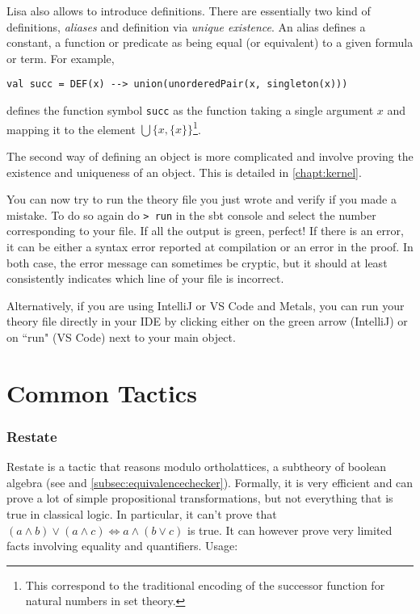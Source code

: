 Lisa also allows to introduce definitions. There are essentially two kind of definitions, \emph{aliases} and definition via \emph{unique existence}.
An alias defines a constant, a function or predicate as being equal (or equivalent) to a given formula or term. For example,

\noindent\begin{minipage}{\linewidth}\vspace{1em}
  \begin{lstlisting}[language=lisa, frame=single]
  val succ = DEF(x) --> union(unorderedPair(x, singleton(x)))
  \end{lstlisting}
\end{minipage}
defines the function symbol \lstinline|succ| as the function taking a single argument $x$ and mapping it to the element $\bigcup \lbrace x, \lbrace x \rbrace \rbrace$\footnote{This correspond to the traditional encoding of the successor function for natural numbers in set theory.}.

The second way of defining an object is more complicated and involve proving the existence and uniqueness of an object. This is detailed in \autoref{chapt:kernel}.

You can now try to run the theory file you just wrote and verify if you made a mistake. To do so again do \lstinline|> run| in the sbt console and select the number corresponding to your file. 
If all the output is green, perfect! If there is an error, it can be either a syntax error reported at compilation or an error in the proof. In both case, the error message can sometimes be cryptic, but it should at least consistently indicates which line of your file is incorrect.

Alternatively, if you are using IntelliJ or VS Code and Metals, you can run your theory file directly in your IDE by clicking either on the green arrow (IntelliJ) or on ``run" (VS Code) next to your main object.


\section{Common Tactics}
\subsubsection*{Restate}
Restate is a tactic that reasons modulo ortholattices, a subtheory of boolean algebra (see \cite{guilloudFormulaNormalizationsVerification2023} and \autoref{subsec:equivalencechecker}). Formally, it is very efficient and can prove a lot of simple propositional transformations, but not everything that is true in classical logic. In particular, it can't prove that $(a\land b) \lor (a \land c) \iff a \land (b \lor c)$ is true. It can however prove very limited facts involving equality and quantifiers. Usage:


